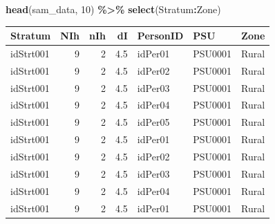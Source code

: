 \documentclass[
  spanish,
  12pt,
]{book}
\newenvironment{Shaded}{\begin{snugshade}}{\end{snugshade}}
\newcommand{\AttributeTok}[1]{\textcolor[rgb]{0.13,0.29,0.53}{#1}}
\newcommand{\DecValTok}[1]{\textcolor[rgb]{0.00,0.00,0.81}{#1}}
\newcommand{\FunctionTok}[1]{\textcolor[rgb]{0.13,0.29,0.53}{\textbf{#1}}}
\newcommand{\NormalTok}[1]{#1}
\newcommand{\OtherTok}[1]{\textcolor[rgb]{0.56,0.35,0.01}{#1}}
\newcommand{\SpecialCharTok}[1]{\textcolor[rgb]{0.81,0.36,0.00}{\textbf{#1}}}
\newcommand{\StringTok}[1]{\textcolor[rgb]{0.31,0.60,0.02}{#1}}
\begin{document}
\begin{Shaded}
\end{Shaded}

\begin{Shaded}
\begin{Highlighting}[]
\FunctionTok{head}\NormalTok{(sam\_data, }\DecValTok{10}\NormalTok{) }\SpecialCharTok{\%\textgreater{}\%} \FunctionTok{select}\NormalTok{(Stratum}\SpecialCharTok{:}\NormalTok{Zone)}
\end{Highlighting}
\end{Shaded}

\begin{tabular}{l|r|r|r|l|l|l}
\hline
Stratum & NIh & nIh & dI & PersonID & PSU & Zone\\
\hline
idStrt001 & 9 & 2 & 4.5 & idPer01 & PSU0001 & Rural\\
\hline
idStrt001 & 9 & 2 & 4.5 & idPer02 & PSU0001 & Rural\\
\hline
idStrt001 & 9 & 2 & 4.5 & idPer03 & PSU0001 & Rural\\
\hline
idStrt001 & 9 & 2 & 4.5 & idPer04 & PSU0001 & Rural\\
\hline
idStrt001 & 9 & 2 & 4.5 & idPer05 & PSU0001 & Rural\\
\hline
idStrt001 & 9 & 2 & 4.5 & idPer01 & PSU0001 & Rural\\
\hline
idStrt001 & 9 & 2 & 4.5 & idPer02 & PSU0001 & Rural\\
\hline
idStrt001 & 9 & 2 & 4.5 & idPer03 & PSU0001 & Rural\\
\hline
idStrt001 & 9 & 2 & 4.5 & idPer04 & PSU0001 & Rural\\
\hline
idStrt001 & 9 & 2 & 4.5 & idPer01 & PSU0001 & Rural\\
\hline
\end{tabular}
\end{document}
